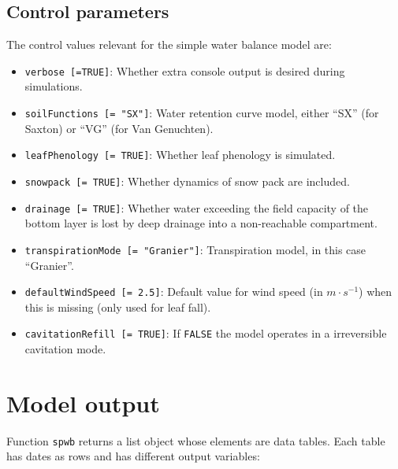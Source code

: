 \documentclass[]{book}
\providecommand{\tightlist}{%
  \setlength{\itemsep}{0pt}\setlength{\parskip}{0pt}}
\begin{document}
\subsection{Control parameters}\label{control-parameters-1}

The control values relevant for the simple water balance model are:

\begin{itemize}
\tightlist
\item
  \texttt{verbose\ {[}=TRUE{]}}: Whether extra console output is desired
  during simulations.
\item
  \texttt{soilFunctions\ {[}=\ "SX"{]}}: Water retention curve model,
  either ``SX'' (for Saxton) or ``VG'' (for Van Genuchten).
\item
  \texttt{leafPhenology\ {[}=\ TRUE{]}}: Whether leaf phenology is
  simulated.
\item
  \texttt{snowpack\ {[}=\ TRUE{]}}: Whether dynamics of snow pack are
  included.
\item
  \texttt{drainage\ {[}=\ TRUE{]}}: Whether water exceeding the field
  capacity of the bottom layer is lost by deep drainage into a
  non-reachable compartment.
\item
  \texttt{transpirationMode\ {[}=\ "Granier"{]}}: Transpiration model,
  in this case ``Granier''.
\item
  \texttt{defaultWindSpeed\ {[}=\ 2.5{]}}: Default value for wind speed
  (in \(m \cdot s^{-1}\)) when this is missing (only used for leaf
  fall).
\item
  \texttt{cavitationRefill\ {[}=\ TRUE{]}}: If \texttt{FALSE} the model
  operates in a irreversible cavitation mode.
\end{itemize}

\section{Model output}\label{model-output}

Function \texttt{spwb} returns a list object whose elements are data
tables. Each table has dates as rows and has different output variables:
\end{document}
